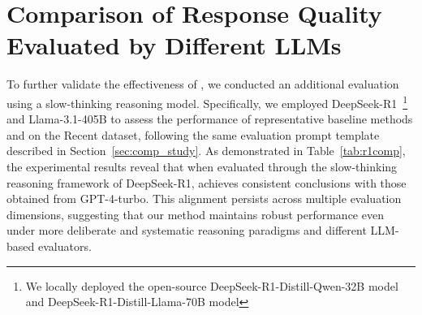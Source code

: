 \section{Comparison of Response Quality Evaluated by Different LLMs}
\label{sec:r1result}
To further validate the effectiveness of \ourmodel, we conducted an additional evaluation using a slow-thinking reasoning model. Specifically, we employed DeepSeek-R1~\cite{guo2025deepseek}\footnote{We locally deployed the open-source DeepSeek-R1-Distill-Qwen-32B model and DeepSeek-R1-Distill-Llama-70B model} and Llama-3.1-405B to assess the performance of representative baseline methods and \ourmodel on the Recent dataset, following the same evaluation prompt template described in Section~\ref{sec:comp_study}. As demonstrated in Table~\ref{tab:r1comp}, the experimental results reveal that when evaluated through the slow-thinking reasoning framework of DeepSeek-R1, \ourmodel achieves consistent conclusions with those obtained from GPT-4-turbo. This alignment persists across multiple evaluation dimensions, suggesting that our method maintains robust performance even under more deliberate and systematic reasoning paradigms and different LLM-based evaluators.



